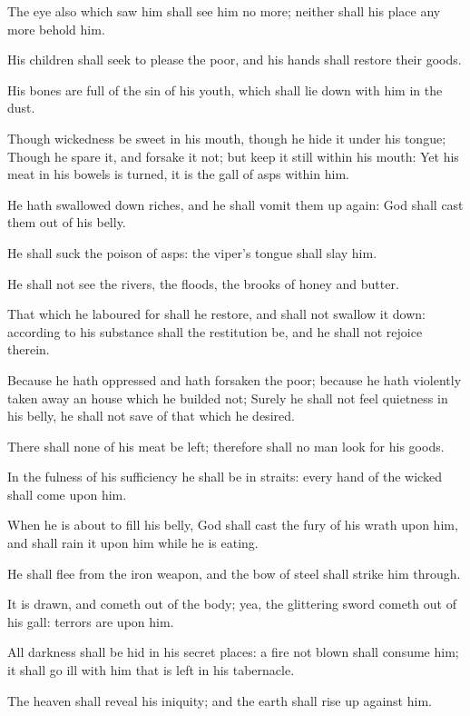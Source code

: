 \verse The eye also which saw him shall see him no more; neither shall his place any more behold him.

\verse His children shall seek to please the poor, and his hands shall restore their goods.

\verse His bones are full of the sin of his youth, which shall lie down with him in the dust.

\verse Though wickedness be sweet in his mouth, though he hide it under his tongue; \verse Though he spare it, and forsake it not; but keep it still within his mouth: \verse Yet his meat in his bowels is turned, it is the gall of asps within him.

\verse He hath swallowed down riches, and he shall vomit them up again: God shall cast them out of his belly.

\verse He shall suck the poison of asps: the viper's tongue shall slay him.

\verse He shall not see the rivers, the floods, the brooks of honey and butter.

\verse That which he laboured for shall he restore, and shall not swallow it down: according to his substance shall the restitution be, and he shall not rejoice therein.

\verse Because he hath oppressed and hath forsaken the poor; because he hath violently taken away an house which he builded not; \verse Surely he shall not feel quietness in his belly, he shall not save of that which he desired.

\verse There shall none of his meat be left; therefore shall no man look for his goods.

\verse In the fulness of his sufficiency he shall be in straits: every hand of the wicked shall come upon him.

\verse When he is about to fill his belly, God shall cast the fury of his wrath upon him, and shall rain it upon him while he is eating.

\verse He shall flee from the iron weapon, and the bow of steel shall strike him through.

\verse It is drawn, and cometh out of the body; yea, the glittering sword cometh out of his gall: terrors are upon him.

\verse All darkness shall be hid in his secret places: a fire not blown shall consume him; it shall go ill with him that is left in his tabernacle.

\verse The heaven shall reveal his iniquity; and the earth shall rise up against him.

